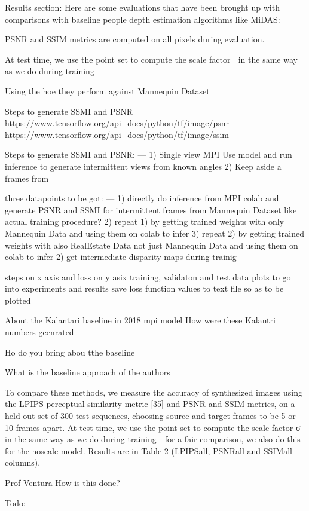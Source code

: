 Results section:
Here are some evaluations that have been brought up with comparisons with baseline people depth estimation algorithms like MiDAS:


PSNR and SSIM metrics are computed on all pixels during evaluation.

At test time, we use the point
set to compute the scale factor  in the same way as we do
during training—

Using the 
hoe they perform against Mannequin Dataset 

Steps to generate SSMI and PSNR
\cite{wang_ssmi_psnr}
\url{https://www.tensorflow.org/api_docs/python/tf/image/psnr}
\url{https://www.tensorflow.org/api_docs/python/tf/image/ssim}

Steps to generate SSMI and PSNR: ---
1) Single view MPI Use model and run inference to generate intermittent views from known angles 
2) Keep aside a frames from 

three datapoints to be got: ---
1) directly do inference from MPI colab and generate PSNR and SSMI for intermittent frames from Mannequin Dataset like actual training procedure?
2) repeat 1) by getting trained weights with only Mannequin Data and using them on colab to infer  
3) repeat 2) by getting trained weights with also RealEstate Data not just Mannequin Data and using them on colab to infer
2) get intermediate disparity maps during trainig 

steps on x axis and loss on y asix
training, validaton and test data plots to go into experiments and results
save loss function values to text file so as to be plotted

About the Kalantari baseline in 2018 mpi model
How were these Kalantri numbers geenrated

Ho do you bring abou tthe baseline 

What is the baseline approach of the authors 

To compare these methods, we measure the accuracy of
synthesized images using the LPIPS perceptual similarity
metric [35] and PSNR and SSIM metrics, on a held-out set
of 300 test sequences, choosing source and target frames
to be 5 or 10 frames apart. At test time, we use the point
set to compute the scale factor σ in the same way as we do
during training—for a fair comparison, we also do this for
the noscale model. Results are in Table 2 (LPIPSall, PSNRall
and SSIMall columns).

Prof Ventura How is this done?


Todo:


